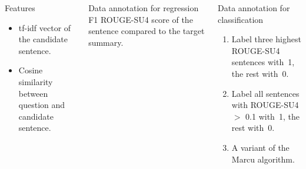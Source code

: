 \documentclass[final]{beamer}
\newlength{\onecolwid}
\newlength{\twocolwid}
\begin{document}
\begin{frame}[t]
\begin{columns}[t]
\begin{column}{\twocolwid}





\begin{columns}
\column{\onecolwid}

\begin{block}{\Large Features}
\Large
\begin{itemize}
\item tf-idf vector of the candidate sentence.
\item Cosine similarity between question and candidate sentence.
\end{itemize}
\end{block}

\begin{block}{\Large Data annotation for regression}
\Large F1 ROUGE-SU4 score of the sentence compared to the target summary. 
\end{block}

\begin{block}{\Large Data annotation for classification}
\Large
\begin{enumerate}
\item Label three highest ROUGE-SU4 sentences with~1, the rest with~0.
\item Label all sentences with ROUGE-SU4 $>$ 0.1 with~1, the rest with~0.
\item A variant of the Marcu algorithm.
\end{enumerate}
\end{block}


\end{columns}
\end{column}
\end{columns}
\end{frame}
\end{document}
